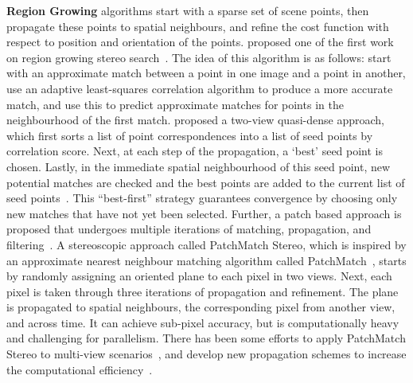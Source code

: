 
\textbf{Region Growing} algorithms start with a sparse set of scene points, then propagate these points to spatial neighbours, and refine the cost function with respect to position and orientation of the points. \citeauthor{otto1989region} proposed one of the first work on region growing stereo search~\cite{otto1989region}. The idea of this algorithm is as follows: start with an approximate match between a point in one image and a point in another, use an adaptive least-squares correlation algorithm to produce a more accurate match, and use this to predict approximate matches for points in the neighbourhood of the first match. \citeauthor{lhuillier2002match} proposed a two-view quasi-dense approach, which first sorts a list of point correspondences into a list of seed points by correlation score. Next, at each step of the propagation, a `best' seed point is chosen. Lastly, in the immediate spatial neighbourhood of this seed point, new potential matches are checked and the best points are added to the current list of seed points~\cite{lhuillier2002match,lhuillier2005quasi}. This ``best-first'' strategy guarantees convergence by choosing only new matches that have not yet been selected. Further, a patch based approach is proposed that undergoes multiple iterations of matching, propagation, and filtering~\cite{furukawa2010accurate}. A stereoscopic approach called PatchMatch Stereo, which is inspired by an approximate nearest neighbour matching algorithm called PatchMatch~\cite{Barnes:2009:PAR}, starts by randomly assigning an oriented plane to each pixel in two views. Next, each pixel is taken through three iterations of propagation and refinement. The plane is propagated to spatial neighbours, the corresponding pixel from another view, and across time. It can achieve sub-pixel accuracy, but is computationally heavy and challenging for parallelism. There has been some efforts to apply PatchMatch Stereo to multi-view scenarios~\cite{galliani2015massively,uh2014efficient,zheng2014patchmatch}, and develop new propagation schemes to increase the computational efficiency~\cite{galliani2015massively}.

